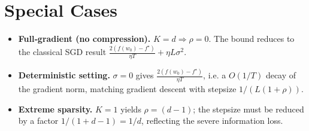 \documentclass{article}
\begin{document}
\section*{Special Cases}
\begin{itemize}
\item \textbf{Full‑gradient (no compression).} $K=d\Rightarrow\rho=0$. The bound reduces to the classical SGD result $\frac{2(f(w_0)-f^\star)}{\eta T}+\eta L\sigma^{2}$.
\item \textbf{Deterministic setting.} $\sigma=0$ gives $\frac{2(f(w_0)-f^\star)}{\eta T}$, i.e. a $O(1/T)$ decay of the gradient norm, matching gradient descent with stepsize $1/(L(1+\rho))$.
\item \textbf{Extreme sparsity.} $K=1$ yields $\rho=(d-1)$; the stepsize must be reduced by a factor $1/(1+d-1)=1/d$, reflecting the severe information loss.
\end{itemize}
\end{document}

